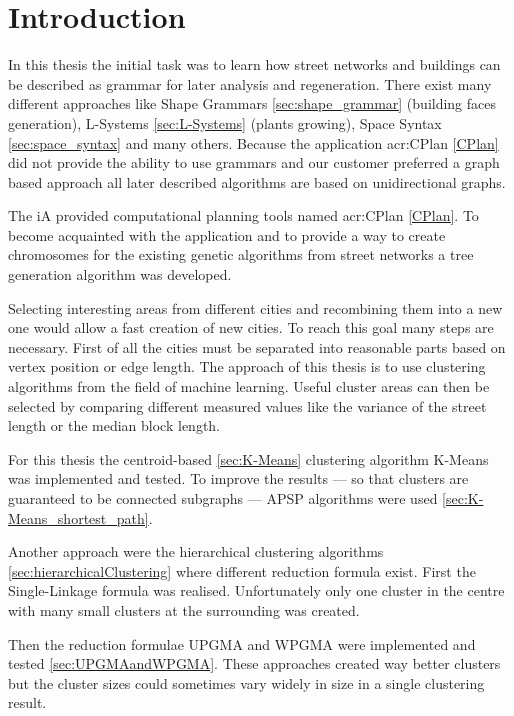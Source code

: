\chapter{Introduction}
In this thesis the initial task was to learn how street networks and buildings can be described as grammar for later analysis and regeneration. There exist many different approaches like Shape Grammars \ref{sec:shape_grammar} (building faces generation), L-Systems \ref{sec:L-Systems} (plants growing), Space Syntax \ref{sec:space_syntax} and many others. Because the application \acrshort{acr:CPlan} \ref{CPlan} did not provide the ability to use grammars and our customer preferred a graph based approach all later described algorithms are based on unidirectional graphs.

The \gls{iA} provided computational planning tools named \acrshort{acr:CPlan} \ref{CPlan}. To become acquainted with the application and to provide a way to create chromosomes for the existing genetic algorithms from street networks a tree generation algorithm was developed.

Selecting interesting areas from different cities and recombining them into a new one would allow a fast creation of new cities. To reach this goal many steps are necessary. First of all the cities must be separated into reasonable parts based on vertex position or edge length. The approach of this thesis is to use clustering algorithms from the field of machine learning. Useful cluster areas can then be selected by comparing different measured values like the variance of the street length or the median block length.

For this thesis the centroid-based \ref{sec:K-Means} clustering algorithm K-Means was implemented and tested. To improve the results --- so that clusters are guaranteed to be connected subgraphs --- \gls{APSP} algorithms were used \ref{sec:K-Means_shortest_path}.

Another approach were the hierarchical clustering algorithms \ref{sec:hierarchicalClustering} where different reduction formula exist. First the Single-Linkage formula was realised. Unfortunately only one cluster in the centre with many small clusters at the surrounding was created.

\newpage

Then the reduction formulae \gls{UPGMA} and \gls{WPGMA} were implemented and tested \ref{sec:UPGMAandWPGMA}. These approaches created way better clusters but the cluster sizes could sometimes vary widely in size in a single clustering result.

